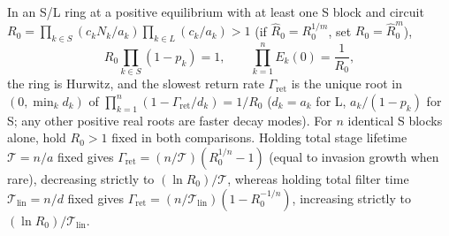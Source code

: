 \begin{proposition}\label{prop:dyn-k8}
In an S/L ring at a positive equilibrium with at least one S block and circuit $R_0 = \prod_{k \in S}(c_k N_k / a_k)\prod_{k \in L}(c_k / a_k) > 1$ (if $\widehat{R}_0 = R_0^{1/m}$, set $R_0 = \widehat{R}_0^m$),
\begin{equation}\label{eq:dyn-slgain}
R_0 \prod_{k \in S}(1 - p_k) = 1, \qquad \prod_{k=1}^n E_k(0) = \frac{1}{R_0},
\end{equation}
the ring is Hurwitz, and the slowest return rate $\Gamma_{\mathrm{ret}}$ is the unique root in $(0, \min_k d_k)$ of $\prod_{k=1}^n (1 - \Gamma_{\mathrm{ret}}/d_k) = 1/R_0$ ($d_k = a_k$ for L, $a_k/(1 - p_k)$ for S; any other positive real roots are faster decay modes). For $n$ identical S blocks alone, hold $R_0>1$ fixed in both comparisons. Holding total stage lifetime $\mathcal{T} = n/a$ fixed gives $\Gamma_{\mathrm{ret}} = (n/\mathcal{T})(R_0^{1/n} - 1)$ (equal to invasion growth when rare), decreasing strictly to $(\ln R_0)/\mathcal{T}$, whereas holding total filter time $\mathcal{T}_{\mathrm{lin}} = n/d$ fixed gives $\Gamma_{\mathrm{ret}} = (n/\mathcal{T}_{\mathrm{lin}})(1 - R_0^{-1/n})$, increasing strictly to $(\ln R_0)/\mathcal{T}_{\mathrm{lin}}$.
\end{proposition}

